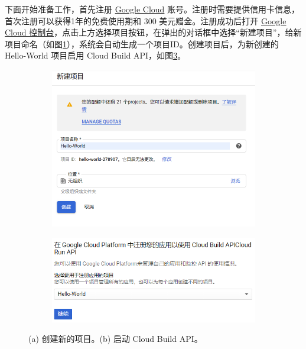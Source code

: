\documentclass[11pt]{article}
\begin{document}
下面开始准备工作，首先注册 \href{https://cloud.google.com/}{Google Cloud} 账号。注册时需要提供信用卡信息，首次注册可以获得1年的免费使用期和 300 美元赠金。注册成功后打开 \href{https://console.cloud.google.com/}{Google Cloud 控制台}，点击上方选择项目按钮，在弹出的对话框中选择“新建项目”，给新项目命名（如图\ref{figs:name}），系统会自动生成一个项目ID。创建项目后，为新创建的 Hello-World 项目启用 Cloud Build API，如图\ref{figs:start}。
\begin{figure}[!htbp]
	\begin{subfigure}[b]{0.5\linewidth}
		\includegraphics[width=\linewidth]{figs/cloudrun_name.png}
		\caption{}
		\label{figs:name}
	\end{subfigure}
	\begin{subfigure}[b]{0.5\linewidth}
		\includegraphics[width=\linewidth]{figs/cloudrunstartapi.png}
		\caption{}
		\label{figs:start}
	\end{subfigure}
	\caption{(a) 创建新的项目。(b) 启动 Cloud Build API。}
\end{figure}
\end{document}
